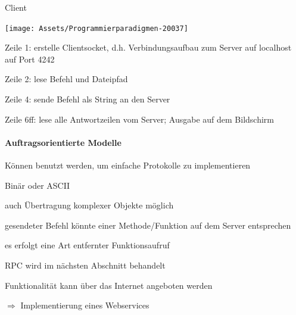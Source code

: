\documentclass[10pt]{article}
\begin{document}
  Client
  \begin{center}
    \centering
    \texttt{[image: Assets/Programmierparadigmen-20037]}
  \end{center}
  \begin{itemize*}
    \item Zeile 1: erstelle Clientsocket, d.h. Verbindungsaufbau zum Server auf localhost auf Port 4242
    \item Zeile 2: lese Befehl und Dateipfad
    \item Zeile 4: sende Befehl als String an den Server
    \item Zeile 6ff: lese alle Antwortzeilen vom Server; Ausgabe auf dem Bildschirm
  \end{itemize*}
  
  \paragraph{Auftragsorientierte Modelle}
  
  \begin{itemize*}
    \item Können benutzt werden, um einfache Protokolle zu implementieren
    \item Binär oder ASCII
    \begin{itemize*}
      \item auch Übertragung komplexer Objekte möglich
    \end{itemize*}
    \item gesendeter Befehl könnte einer Methode/Funktion auf dem Server entsprechen
    \begin{itemize*}
      \item es erfolgt eine Art entfernter Funktionsaufruf
      \item RPC wird im nächsten Abschnitt behandelt
    \end{itemize*}
    \item Funktionalität kann über das Internet angeboten werden
    \begin{itemize*}
      \item[$\Rightarrow$] Implementierung eines Webservices
    \end{itemize*}
  \end{itemize*}
  
\end{document}
